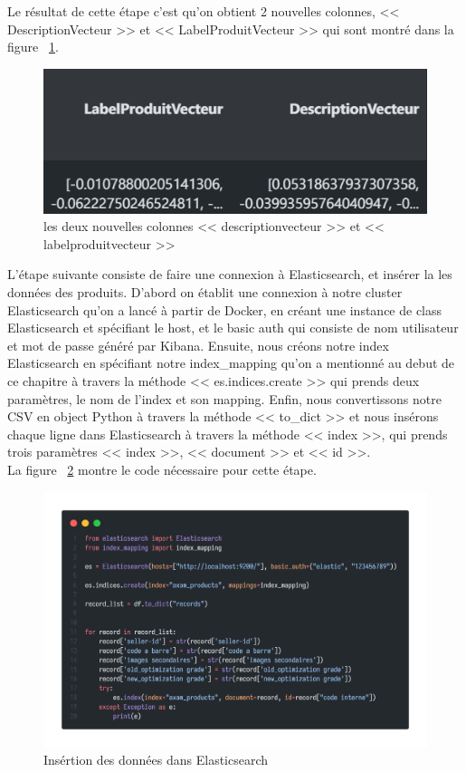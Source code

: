 \noindent
Le résultat de cette étape c'est qu'on obtient 2 nouvelles colonnes, << DescriptionVecteur >> et << LabelProduitVecteur >> qui sont montré dans la figure ~\ref{fig:encodedvectors}.

\begin{figure}[h]
	\centering
	\includegraphics[width=\textwidth]{logos/encodedvectors.png}
	\caption{les deux nouvelles colonnes << descriptionvecteur >> et << labelproduitvecteur >> }
	\label{fig:encodedvectors}
\end{figure}

\noindent
L'étape suivante consiste de faire une connexion à Elasticsearch, et insérer la les données des produits. D'abord on établit une connexion à notre cluster Elasticsearch qu'on a lancé à partir de Docker, en créant une instance de class Elasticsearch et spécifiant le host, et le basic auth qui consiste de nom utilisateur et mot de passe généré par Kibana. Ensuite, nous créons notre index Elasticsearch en spécifiant notre index\_mapping qu'on a mentionné au debut de ce chapitre à travers la méthode << es.indices.create >> qui prends deux paramètres, le nom de l'index et son mapping. Enfin, nous convertissons notre CSV en object Python à travers la méthode << to\_dict >> et nous insérons chaque ligne dans Elasticsearch à travers la méthode << index >>, qui prends trois paramètres << index >>, << document >> et << id >>. \\
La figure ~\ref{fig:insertintoelastic} montre le code nécessaire pour cette étape.

\begin{figure}[h]
	\centering
	\includegraphics[width=\textwidth]{logos/insert_into_elastic.png}
	\caption{Insértion des données dans Elasticsearch}
	\label{fig:insertintoelastic}
\end{figure}

